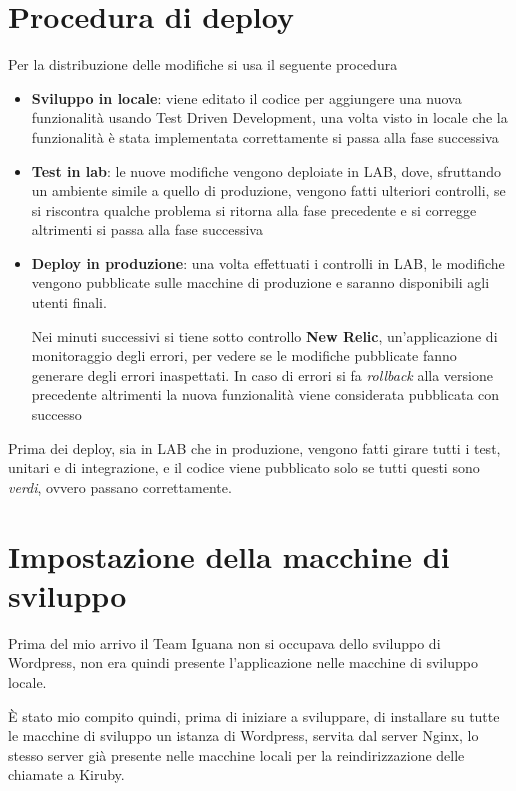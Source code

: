 \section{Procedura di deploy}
Per la distribuzione delle modifiche si usa il seguente procedura
\begin{itemize}
\item {\bf Sviluppo in locale}: viene editato il codice per aggiungere una nuova funzionalità usando
Test Driven Development, una volta visto in locale che la funzionalità è stata implementata correttamente si passa alla fase successiva
\item {\bf Test in lab}: le nuove modifiche vengono deploiate in LAB, dove, sfruttando un ambiente simile a quello di 
produzione, vengono fatti ulteriori controlli, se si riscontra qualche problema si ritorna alla fase precedente e si corregge
altrimenti si passa alla fase successiva 
\item {\bf Deploy in produzione}: una volta effettuati i controlli in LAB, le modifiche vengono pubblicate sulle macchine
di produzione e saranno disponibili agli utenti finali. 

Nei minuti successivi si tiene sotto controllo {\bf New Relic}, un'applicazione di monitoraggio degli errori, per vedere se le modifiche pubblicate fanno generare degli errori inaspettati.
In caso di errori si fa \emph{rollback} alla versione precedente altrimenti la nuova funzionalità viene considerata pubblicata con successo
\end{itemize}

Prima dei deploy, sia in LAB che in produzione, vengono fatti girare tutti i test, unitari e di integrazione, e il codice viene pubblicato solo se tutti questi sono \emph{verdi}, ovvero passano correttamente.

\section{Impostazione della macchine di sviluppo}

Prima del mio arrivo il Team Iguana non si occupava dello sviluppo di Wordpress, non era quindi presente
l'applicazione nelle macchine di sviluppo locale.

È stato mio compito quindi, prima di iniziare a sviluppare, di installare su tutte le macchine di sviluppo
un istanza di Wordpress, servita dal server Nginx\cite{NGINX}, lo stesso server già presente nelle macchine locali per
la reindirizzazione delle chiamate a Kiruby.

